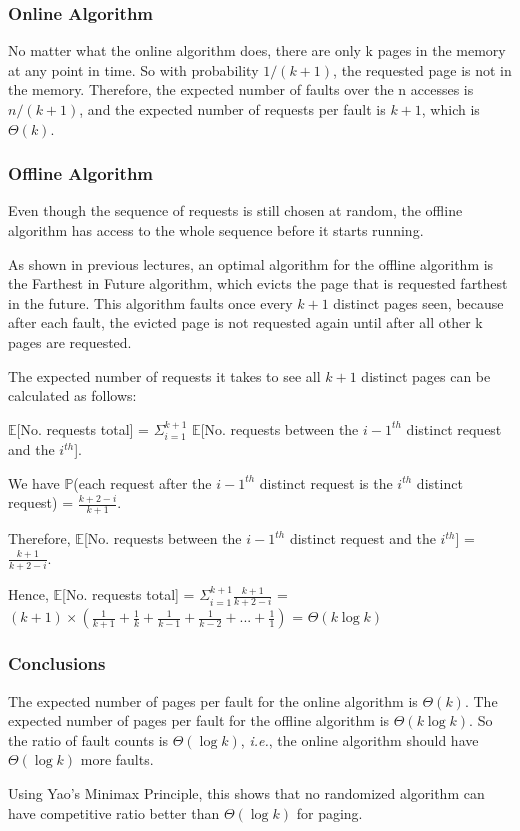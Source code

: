\documentclass{article}
\begin{document}
\subsubsection{Online Algorithm}

No matter what the online algorithm does, there are only k pages in the memory at any point in time.  So with probability $1/(k+1)$, the requested page is not in the memory.  Therefore, the expected number of faults over the n accesses is $n/(k+1)$, and the expected number of requests per fault is $k+1$, which is $\Theta(k)$.

\subsubsection{Offline Algorithm}

Even though the sequence of requests is still chosen at random, the offline algorithm has access to the whole sequence before it starts running.

As shown in previous lectures, an optimal algorithm for the offline algorithm is the Farthest in Future algorithm, which evicts the page that is requested farthest in the future.  This algorithm faults once every $k+1$ distinct pages seen, because after each fault, the evicted page is not requested again until after all other k pages are requested.

The expected number of requests it takes to see all $k+1$ distinct pages can be calculated as follows:

$\mathbb{E}$[No. requests total] = $\Sigma_{i=1}^{k+1}$ $\mathbb{E}$[No. requests between the $i-1^{th}$ distinct request and the $i^{th}$].

We have $\mathbb{P}$(each request after the $i-1^{th}$ distinct request is the $i^{th}$ distinct request) = $\frac{k+2-i}{k+1}$. 

Therefore, $\mathbb{E}$[No. requests between the $i-1^{th}$ distinct request and the $i^{th}$] = $\frac{k+1}{k+2-i}$. 

Hence, $\mathbb{E}$[No. requests total] = $\Sigma_{i=1}^{k+1} \frac{k+1}{k+2-i}$ = $(k+1)\times(\frac{1}{k+1}+\frac{1}{k}+\frac{1}{k-1}+\frac{1}{k-2}+...+\frac{1}{1})$ = $\Theta(k\log k)$

\subsubsection{Conclusions}

The expected number of pages per fault for the online algorithm is $\Theta(k)$.  The expected number of pages per fault for the offline algorithm is $\Theta(k\log k)$.  So the ratio of fault counts is $\Theta(\log k)$, \emph{i.e.}, the online algorithm should have $\Theta(\log k)$ more faults.

Using Yao's Minimax Principle, this shows that no randomized algorithm can have competitive ratio better than $\Theta(\log k)$ for paging.
\end{document}
